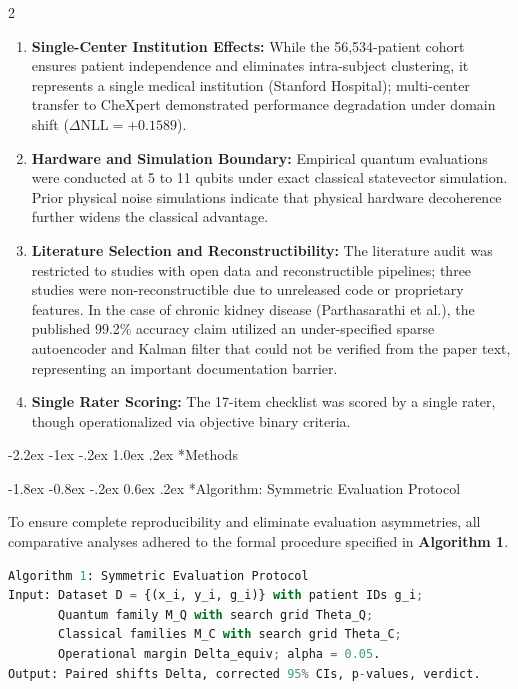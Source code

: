 \documentclass[10pt,a4paper,twoside]{article}
\makeatletter
\renewcommand{\section}{\@startsection{section}{1}{\z@}%
  {-2.2ex \@plus -1ex \@minus -.2ex}%
  {1.0ex \@plus.2ex}%
  {\normalfont\large\sffamily\bfseries\color{naturedark}}}
\renewcommand{\subsection}{\@startsection{subsection}{2}{\z@}%
  {-1.8ex \@plus -0.8ex \@minus -.2ex}%
  {0.6ex \@plus.2ex}%
  {\normalfont\normalsize\sffamily\bfseries\color{naturedark}}}
\makeatother
\begin{document}
\begin{multicols}{2}
\begin{enumerate}
  \item \textbf{Single-Center Institution Effects:} While the 56,534-patient cohort ensures patient independence and eliminates intra-subject clustering, it represents a single medical institution (Stanford Hospital); multi-center transfer to CheXpert demonstrated performance degradation under domain shift ($\Delta\text{NLL} = +0.1589$).
  \item \textbf{Hardware and Simulation Boundary:} Empirical quantum evaluations were conducted at 5 to 11 qubits under exact classical statevector simulation. Prior physical noise simulations indicate that physical hardware decoherence further widens the classical advantage.
  \item \textbf{Literature Selection and Reconstructibility:} The literature audit was restricted to studies with open data and reconstructible pipelines; three studies were non-reconstructible due to unreleased code or proprietary features. In the case of chronic kidney disease (Parthasarathi et al.), the published 99.2\% accuracy claim utilized an under-specified sparse autoencoder and Kalman filter that could not be verified from the paper text, representing an important documentation barrier.
  \item \textbf{Single Rater Scoring:} The 17-item checklist was scored by a single rater, though operationalized via objective binary criteria.
\end{enumerate}

\section*{Methods}

\subsection*{Algorithm: Symmetric Evaluation Protocol}

To ensure complete reproducibility and eliminate evaluation asymmetries, all comparative analyses adhered to the formal procedure specified in \textbf{Algorithm 1}.

\begin{lstlisting}[language=Python, caption={Algorithm 1: Symmetric Evaluation Protocol for Clinical Prediction Models.}]
Algorithm 1: Symmetric Evaluation Protocol
Input: Dataset D = {(x_i, y_i, g_i)} with patient IDs g_i;
       Quantum family M_Q with search grid Theta_Q;
       Classical families M_C with search grid Theta_C;
       Operational margin Delta_equiv; alpha = 0.05.
Output: Paired shifts Delta, corrected 95% CIs, p-values, verdict.


\end{lstlisting}
\end{multicols}
\end{document}
